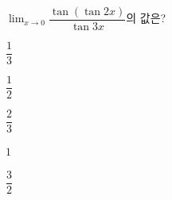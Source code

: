 $\displaystyle\lim_{x\to 0}\dfrac{\tan(\tan 2x)}{\tan 3x}$의 값은?
\begin{choices32}{\rule[-3ex]{0pt}{8ex}$\dfrac{1}{3}$}{\rule[-3ex]{0pt}{8ex}$\dfrac{1}{2}$}{\rule[-3ex]{0pt}{8ex}$\dfrac{2}{3}$}{\rule[-3ex]{0pt}{8ex}$1$}{\rule[-3ex]{0pt}{8ex}$\dfrac{3}{2}$}\end{choices32}
